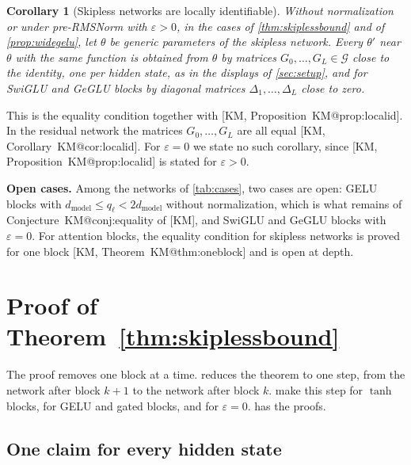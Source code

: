 \documentclass[10pt]{article}
\makeatletter
\newtheorem{corollary}[theorem]{Corollary}
\theoremstyle{definition}
\theoremstyle{remark}
\newcommand{\dm}{d_{\mathrm{model}}}
\newcommand{\G}{\mathcal{G}}
\newcommand{\para}[1]{\smallskip\noindent\textbf{#1}\hspace{0.5em}}
\newcommand{\KMn}[1]{\csname KM@#1\endcsname}
\newcommand{\KM}[2]{[KM, #1~\KMn{#2}]}
\makeatother
\begin{document}
\begin{corollary}[Skipless networks are locally identifiable]\label{cor:skiplesslocalid}
Without normalization or under pre-RMSNorm with $\varepsilon > 0$, in the cases of \cref{thm:skiplessbound} and of \cref{prop:widegelu}, let $\theta$ be generic parameters of the skipless network. Every $\theta'$ near $\theta$ with the same function is obtained from $\theta$ by matrices $G_0, \dots, G_L \in \G$ close to the identity, one per hidden state, as in the displays of \cref{sec:setup}, and for SwiGLU and GeGLU blocks by diagonal matrices $\Delta_1, \dots, \Delta_L$ close to zero.
\end{corollary}

This is the equality condition together with \KM{Proposition}{prop:localid}. In the residual network the matrices $G_0, \dots, G_L$ are all equal \KM{Corollary}{cor:localid}. For $\varepsilon = 0$ we state no such corollary, since \KM{Proposition}{prop:localid} is stated for $\varepsilon > 0$.

\para{Open cases.} Among the networks of \cref{tab:cases}, two cases are open: GELU blocks with $\dm \le q_\ell < 2\dm$ without normalization, which is what remains of Conjecture~\KMn{conj:equality} of [KM], and SwiGLU and GeGLU blocks with $\varepsilon = 0$. For attention blocks, the equality condition for skipless networks is proved for one block \KM{Theorem}{thm:oneblock} and is open at depth.

\section{Proof of Theorem~\ref*{thm:skiplessbound}}\label{sec:proof}

The proof removes one block at a time.  reduces the theorem to one step, from the network after block $k+1$ to the network after block $k$.  make this step for $\tanh$ blocks, for GELU and gated blocks, and for $\varepsilon = 0$.  has the proofs.

\subsection{One claim for every hidden state}\label{sec:claim}
\end{document}

